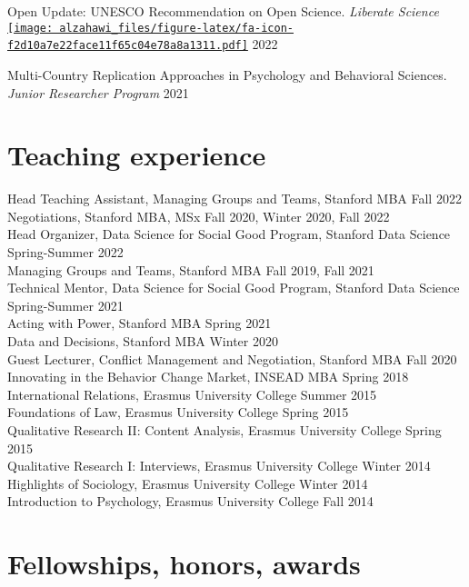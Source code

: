 \documentclass[11pt,a4paper,]{awesome-cv}
\begin{document}
Open Update: UNESCO Recommendation on Open Science. \emph{Liberate
Science}
\href{https://anchor.fm/open-update/episodes/Interview-Meng-Liu-and-Shilaan-Alzahawi-FORRT-project-e1lcg7q}{\texttt{[image: alzahawi\_files/figure-latex/fa-icon-f2d10a7e22face11f65c04e78a8a1311.pdf]}}
\hfill 2022

Multi-Country Replication Approaches in Psychology and Behavioral
Sciences. \emph{Junior Researcher Program} \hfill 2021

\hypertarget{teaching-experience}{%
\section{Teaching experience}\label{teaching-experience}}

Head Teaching Assistant, Managing Groups and Teams, Stanford MBA
\hfill Fall 2022\\
Negotiations, Stanford MBA, MSx \hfill Fall 2020, Winter 2020, Fall
2022\\
Head Organizer, Data Science for Social Good Program, Stanford Data
Science \hfill Spring-Summer 2022\\
Managing Groups and Teams, Stanford MBA \hfill Fall 2019, Fall 2021\\
Technical Mentor, Data Science for Social Good Program, Stanford Data
Science \hfill Spring-Summer 2021\\
Acting with Power, Stanford MBA \hfill Spring 2021\\
Data and Decisions, Stanford MBA \hfill Winter 2020\\
Guest Lecturer, Conflict Management and Negotiation, Stanford MBA
\hfill Fall 2020\\
Innovating in the Behavior Change Market, INSEAD MBA \hfill Spring
2018\\
International Relations, Erasmus University College \hfill Summer 2015\\
Foundations of Law, Erasmus University College \hfill Spring 2015\\
Qualitative Research II: Content Analysis, Erasmus University College
\hfill Spring 2015\\
Qualitative Research I: Interviews, Erasmus University College
\hfill Winter 2014\\
Highlights of Sociology, Erasmus University College \hfill Winter 2014\\
Introduction to Psychology, Erasmus University College \hfill Fall 2014

\hypertarget{fellowships-honors-awards}{%
\section{Fellowships, honors, awards}\label{fellowships-honors-awards}}
\end{document}
